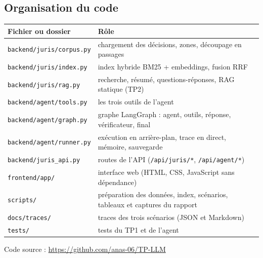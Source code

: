 \documentclass[11pt,a4paper]{article}
\begin{document}
\subsection{Organisation du code}
\begin{center}\small
\begin{tabularx}{\textwidth}{@{}l X@{}}
\toprule
Fichier ou dossier & Rôle \\ \midrule
\texttt{backend/juris/corpus.py} & chargement des décisions, zones, découpage en passages \\
\texttt{backend/juris/index.py} & index hybride BM25 + embeddings, fusion RRF \\
\texttt{backend/juris/rag.py} & recherche, résumé, questions-réponses, RAG statique (TP2) \\
\texttt{backend/agent/tools.py} & les trois outils de l'agent \\
\texttt{backend/agent/graph.py} & graphe LangGraph : agent, outils, réponse, vérificateur, final \\
\texttt{backend/agent/runner.py} & exécution en arrière-plan, trace en direct, mémoire, sauvegarde \\
\texttt{backend/juris\_api.py} & routes de l'API (\texttt{/api/juris/*}, \texttt{/api/agent/*}) \\
\texttt{frontend/app/} & interface web (HTML, CSS, JavaScript sans dépendance) \\
\texttt{scripts/} & préparation des données, index, scénarios, tableaux et captures du rapport \\
\texttt{docs/traces/} & traces des trois scénarios (JSON et Markdown) \\
\texttt{tests/} & tests du TP1 et de l'agent \\
\bottomrule
\end{tabularx}
\end{center}
Code source : \url{https://github.com/anas-06/TP-LLM}
\end{document}
